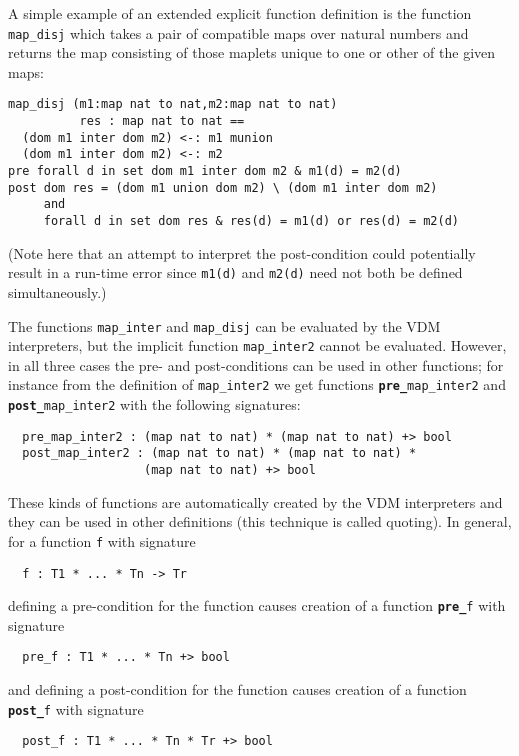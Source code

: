 \documentclass{overturerepchap}
\newcommand{\keyw}[1]{{\bf\ttfamily #1}}
\begin{document}
A simple example of an extended explicit function definition
is the function \texttt{map\_disj} which takes a pair of
compatible maps over natural numbers and returns the map consisting of
those maplets unique to one or other of the given maps:

\begin{lstlisting}
map_disj (m1:map nat to nat,m2:map nat to nat)
          res : map nat to nat ==
  (dom m1 inter dom m2) <-: m1 munion
  (dom m1 inter dom m2) <-: m2
pre forall d in set dom m1 inter dom m2 & m1(d) = m2(d)
post dom res = (dom m1 union dom m2) \ (dom m1 inter dom m2)
     and
     forall d in set dom res & res(d) = m1(d) or res(d) = m2(d)
\end{lstlisting}
\label{mapdisj}

(Note here that an attempt to interpret the post-condition could
potentially result in a run-time error since \texttt{m1(d)} and
\texttt{m2(d)} need not both be defined simultaneously.)

The functions {\tt map\_inter} and {\tt map\_disj} can be evaluated by the
VDM interpreters, but the implicit function {\tt map\_inter2} cannot be evaluated.
However, in all three cases the pre- and post-conditions can be used
in other functions; for instance from the definition of
\texttt{map\_inter2} we get functions \texttt{\keyw{pre\_}map\_inter2}
and \texttt{\keyw{post\_}map\_inter2} with the following signatures:

\begin{lstlisting}
  pre_map_inter2 : (map nat to nat) * (map nat to nat) +> bool
  post_map_inter2 : (map nat to nat) * (map nat to nat) *
                   (map nat to nat) +> bool
\end{lstlisting}
These kinds of functions are automatically created by the VDM
interpreters and they can be used in other definitions (this technique
is called quoting). In general, for a function \texttt{f} with
signature
\begin{lstlisting}
  f : T1 * ... * Tn -> Tr
\end{lstlisting}
defining a pre-condition for the function causes creation of a
function \texttt{\keyw{pre\_}f} with signature
\begin{lstlisting}
  pre_f : T1 * ... * Tn +> bool
\end{lstlisting}
and defining a post-condition for the function causes creation of a
function \texttt{\keyw{post\_}f} with signature
\begin{lstlisting}
  post_f : T1 * ... * Tn * Tr +> bool
\end{lstlisting}
\end{document}
